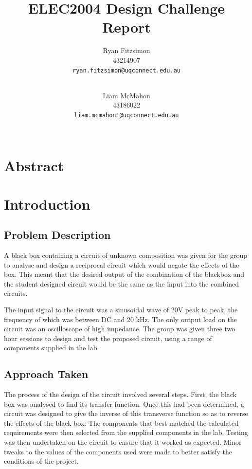 \documentclass[12pt]{article} %
\title{ELEC2004 Design Challenge Report}
\author{
	{Ryan Fitzsimon}\\
	{43214907}\\
	\texttt{ryan.fitzsimon@uqconnect.edu.au}\\\\
	\and
	{Liam McMahon}\\
	{43186022}\\
	\texttt{liam.mcmahon1@uqconnect.edu.au}\\\\
}
\begin{document}
\maketitle
\pagebreak





\section*{Abstract}
\cite{ProgPara}
\pagebreak





\tableofcontents
\pagebreak
\listoftables
\listoffigures
\pagebreak





\section{Introduction}
\subsection{Problem Description}

A black box containing a circuit of unknown composition was given for the group to analyse and design a reciprocal circuit which would negate the effects of the box. This meant that the desired output of the combination of the blackbox and the student designed circuit would be the same as the input into the combined circuits. 


The input signal to the circuit was a sinusoidal wave of 20V peak to peak, the frequency of which was between DC and 20 kHz. The only output load on the circuit was an oscilloscope of high impedance. The group was given three two hour sessions to design and test the proposed circuit, using a range of components supplied in the lab.



\subsection{Approach Taken}

The process of the design of the circuit involved several steps. First, the black box was analysed to find its transfer function. Once this had been determined, a circuit was designed to give the inverse of this transverse function so as to reverse the effects of the black box. The components that best matched the calculated requirements were then selected from the supplied components in the lab. Testing was then undertaken on the circuit to ensure that it worked as expected. Minor tweaks to the values of the components used were made to better satisfy the conditions of the project.
\end{document}
